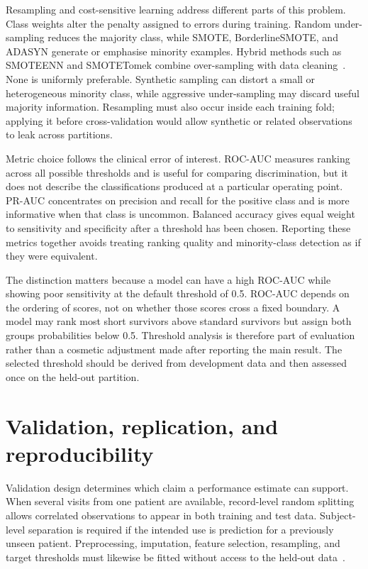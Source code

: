 Resampling and cost-sensitive learning address different parts of this problem. Class weights alter the penalty assigned to errors during training. Random under-sampling reduces the majority class, while \gls{SMOTE}, BorderlineSMOTE, and \gls{ADASYN} generate or emphasise minority examples. Hybrid methods such as \gls{SMOTEENN} and \gls{SMOTETomek} combine over-sampling with data cleaning~\cite{chawla2002smote,lemaitre2017}. None is uniformly preferable. Synthetic sampling can distort a small or heterogeneous minority class, while aggressive under-sampling may discard useful majority information. Resampling must also occur inside each training fold; applying it before cross-validation would allow synthetic or related observations to leak across partitions.

Metric choice follows the clinical error of interest. \gls{ROC-AUC} measures ranking across all possible thresholds and is useful for comparing discrimination, but it does not describe the classifications produced at a particular operating point. \gls{PR-AUC} concentrates on precision and recall for the positive class and is more informative when that class is uncommon. Balanced accuracy gives equal weight to sensitivity and specificity after a threshold has been chosen. Reporting these metrics together avoids treating ranking quality and minority-class detection as if they were equivalent.

The distinction matters because a model can have a high \gls{ROC-AUC} while showing poor sensitivity at the default threshold of 0.5. \gls{ROC-AUC} depends on the ordering of scores, not on whether those scores cross a fixed boundary. A model may rank most short survivors above standard survivors but assign both groups probabilities below 0.5. Threshold analysis is therefore part of evaluation rather than a cosmetic adjustment made after reporting the main result. The selected threshold should be derived from development data and then assessed once on the held-out partition.

\section{Validation, replication, and reproducibility}

Validation design determines which claim a performance estimate can support. When several visits from one patient are available, record-level random splitting allows correlated observations to appear in both training and test data. Subject-level separation is required if the intended use is prediction for a previously unseen patient. Preprocessing, imputation, feature selection, resampling, and target thresholds must likewise be fitted without access to the held-out data~\cite{Grollemund2019,Papaiz2022}.

